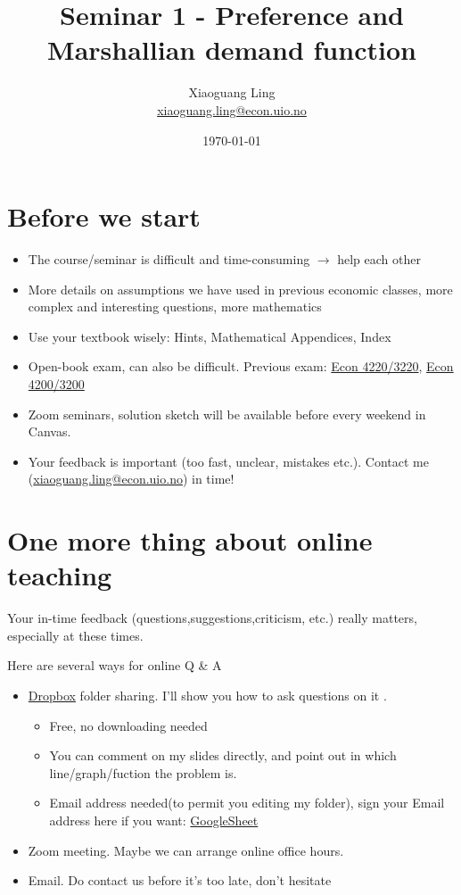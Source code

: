 \documentclass{article}
\title{Seminar 1 - Preference and Marshallian demand function}
\author{Xiaoguang Ling \\  \href{xiaoguang.ling@econ.uio.no}{xiaoguang.ling@econ.uio.no}}
\date{\today}
\begin{document}
\maketitle

\section*{Before we start}

\begin{itemize}
\item The course/seminar is difficult and time-consuming $\rightarrow$ help each other
\item More details on assumptions we have used in previous economic classes, more complex and interesting questions, more mathematics 
\item Use your textbook wisely: Hints, Mathematical Appendices, Index
\item Open-book exam, can also be difficult. Previous exam: \href{https://www.uio.no/studier/emner/sv/oekonomi/ECON4220/previous-exams/}{Econ 4220/3220}, \href{https://www.uio.no/studier/emner/sv/oekonomi/ECON3200/previous-exams/index.html}{Econ 4200/3200}
\item Zoom seminars, solution sketch will be available before every weekend in Canvas.
\item Your feedback is important (too fast, unclear, mistakes etc.). Contact me (\href{xiaoguang.ling@econ.uio.no}{xiaoguang.ling@econ.uio.no}) in time!
\end{itemize}

\newpage

\section*{One more thing about online teaching}
Your in-time feedback (questions,suggestions,criticism, etc.) really matters, especially at these times.

Here are several ways for online Q \& A 
\begin{itemize}
\item \href{https://www.dropbox.com/referrals/AACx30a_-sudYoShl6zfNAQGKT2agvs-2wY?src=global9}{Dropbox} folder sharing. I'll show you how to ask questions on it .
\begin{itemize}
\item Free, no downloading needed
\item You can comment on my slides directly, and point out in which line/graph/fuction the problem is.
\item Email address needed(to permit you editing my folder), sign your Email address here if you want: \href{https://docs.google.com/spreadsheets/d/1pNukxmwu8BX5blj0uOcLB7XxZX7gxgjpQsle1yO1vZI/edit?usp=sharing}{GoogleSheet}
\end{itemize}

\item Zoom meeting. Maybe we can arrange online office hours.
\item Email. Do contact us before it's too late, don't hesitate
\end{itemize}
\end{document}
